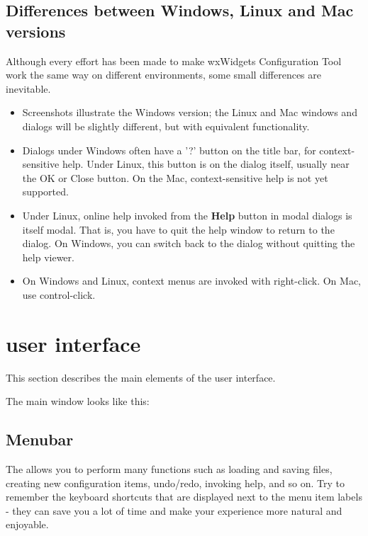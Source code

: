 \section{Differences between Windows, Linux and Mac versions}\label{platformdifferences}

Although every effort has been made to make wxWidgets Configuration Tool work
the same way on different environments, some small differences
are inevitable.

\begin{itemize}\itemsep=10pt
\item Screenshots illustrate the Windows version; the Linux
and Mac windows and dialogs will be slightly different, but with equivalent
functionality.
\item Dialogs under Windows often have a '?' button on the title
bar, for context-sensitive help. Under Linux, this button is
on the dialog itself, usually near the OK or Close button.
On the Mac, context-sensitive help is not yet supported.
\item Under Linux, online help invoked from the {\bf Help} button
in modal dialogs is itself modal. That is, you have to quit
the help window to return to the dialog. On Windows, you can
switch back to the dialog without quitting the help viewer.
\item On Windows and Linux, context menus are invoked with
right-click. On Mac, use control-click.
\end{itemize}

\chapter{\ctshortname user interface}\label{documentui}%
%
\setfooter{\thepage}{}{}{}{}{\thepage}%

This section describes the main elements of the \ctname user interface.

The \ctshortname main window looks like this:

\begin{center}
\end{center}

\section{Menubar}


The  allows you to perform many functions
such as loading and saving files, creating new configuration items,
undo/redo, invoking help, and so on. Try to remember the keyboard shortcuts that are
displayed next to the menu item labels - they can save you a lot of time
and make your \ctshortname experience more natural and enjoyable.

